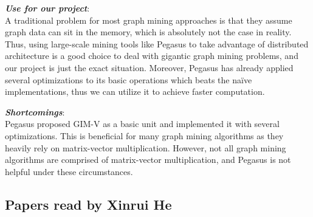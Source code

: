 \begin{itemize*}
\item {\em \textbf{Use for our project}}: \\
A traditional problem for most graph mining approaches is that they assume graph data can sit in the memory, which is absolutely not the case in reality. Thus, using large-scale mining tools like Pegasus to take advantage of distributed architecture is a good choice to deal with gigantic graph mining problems, and our project is just the exact situation. Moreover, Pegasus has already applied several optimizations to its basic operations which beats the naïve implementations, thus we can utilize it to achieve faster computation. \\ 

\item {\em \textbf{Shortcomings}}:\\
Pegasus proposed GIM-V as a basic unit and implemented it with several optimizations. This is beneficial for many graph mining algorithms as they heavily rely on matrix-vector multiplication. However, not all graph mining algorithms are comprised of matrix-vector multiplication, and Pegasus is not helpful under these circumstances. 
\end{itemize*}

\subsection{Papers read by Xinrui He}
